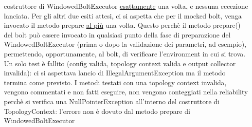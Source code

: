 \documentclass[10pt, a4paper]{article}
\begin{document}
	{costruttore} 
	di WindowedBoltExecutor	\underline{esattamente} una volta, e nessuna eccezione lanciata. 
	Per gli altri due esiti attesi, ci si aspetta che per il mocked bolt, venga invocato il metodo prepare \underline{al più} una
	volta.
	Questo perchè il metodo prepare() del bolt può essere invocato in qualsiasi punto della fase di preparazione del
	WindowedBoltExecutor (prima o dopo la validazione dei parametri, ad esempio), permettendo, opportunamente, al bolt, di
	verificare l'environment in cui si trova.
	Un solo test è fallito (config valida, topology context valida e output collector invalida): ci si aspettava lancio di 
	IllegalArgumentException ma il metodo termina come previsto.
	I metodi testati con una topology context invalida, vengono commentati e non fatti eseguire, non vengono conteggiati nella
	reliability perchè si verifica una NullPointerException all'interno del costruttore di TopologyContext: l'errore non è dovuto
	dal metodo prepare di WindowedBoltExecutor
	
\end{document}
